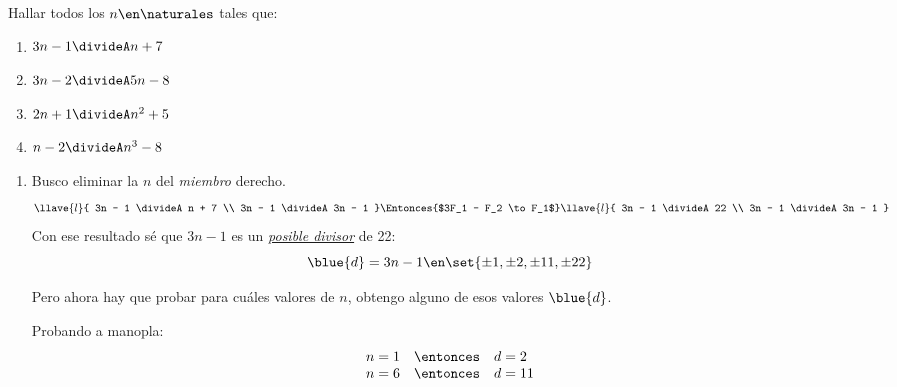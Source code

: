 \def\enumeracion{\alph*)}
\begin{enunciado}{\ejercicio}
  Hallar todos los $n \en \naturales$ tales que:
  \begin{multicols}{2}
    \begin{enumerate}[label=\enumeracion]
      \item $3n - 1 \divideA n+7$
      \item $3n -2 \divideA 5n - 8$
      \item $2n+1 \divideA n^2 + 5$
      \item $n-2 \divideA n^3 - 8$
    \end{enumerate}
  \end{multicols}
\end{enunciado}

\begin{enumerate}[label=\enumeracion]
  \item
        Busco eliminar la $n$ del \textit{miembro} derecho.
        $$
          \llave{l}{
            3n - 1 \divideA n + 7 \\
            3n - 1 \divideA 3n - 1
          }
          \Entonces{$3F_1 - F_2 \to F_1$}
          \llave{l}{
            3n - 1 \divideA 22 \\
            3n - 1 \divideA 3n - 1
          }
        $$
        Con ese resultado sé que $3n -1$ es un \textit{\underline{posible divisor}} de 22:
        $$
          \blue{d} = 3n - 1 \en \set{\pm1,\pm2, \pm11, \pm22}
        $$

        Pero ahora hay que probar para cuáles valores de $n$, obtengo alguno de esos valores $\blue{d}$.

        Probando a manopla:
        $$
          \begin{array}{lcl}
            n = 1 & \entonces & d = 2  \\
            n = 6 & \entonces & d = 11
          \end{array}
        $$


\end{enumerate}
